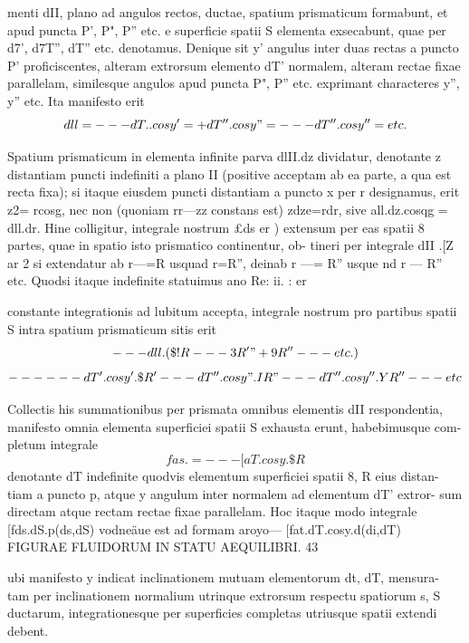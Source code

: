 \documentclass[12pt,a4paper]{article}
\begin{document}
menti   dII,    plano ad angulos rectos,       ductae,   spatium prismaticum      formabunt,
et apud puncta P', P", P'' etc. e superficie spatii S elementa exsecabunt, quae
per d7', d7T'', dT'' etc. denotamus. Denique sit y' angulus inter duas rectas
a puncto    P' proficiscentes, alteram extrorsum elemento            dT' normalem, alteram
rectae fixae parallelam, similesque angulos apud puncta              P", P'' etc. exprimant
characteres     y'', y'' etc.    Ita manifesto erit
\[            dll = ---dT..cosy' = +dT''.cosy" = ---dT''.cosy'' = etc.\]

Spatium prismaticum in elementa infinite parva dlII.dz dividatur, denotante z
distantiam puncti indefiniti a plano II (positive acceptam ab ea parte, a qua est
recta fixa); si itaque eiusdem puncti distantiam a puncto x per r designamus,
erit z2= rcosg, nec non (quoniam rr---zz constans est) zdze=rdr,                sive
all.dz.cosqg = dll.dr.    Hine colligitur, integrale nostrum £ds er              )
extensum per eas spatii 8 partes, quae in spatio isto prismatico continentur, ob-
tineri per integrale dII .[Z
ar 2 si extendatur ab r---=R usquad r=R'',
deinab r ---= R'' usque nd r --- R'' etc. Quodsi itaque indefinite statuimus
ano      Re: ii.          :
er


constante integrationis ad lubitum accepta, integrale nostrum pro partibus spatii
S intra spatium prismaticum sitis erit
\[           --- dll.(\$! R---3R'"+9R''---               etc.)\]
\[           --- ---dT'.cosy'.\$R'---dT''.cosy".IR"---dT''.cosy''.YR''---                         etc\]

Collectis his summationibus per prismata omnibus elementis dII respondentia,
manifesto omnia elementa superficiei spatii S exhausta erunt, habebimusque com-
pletum integrale
\[                          fas. =                    --- [aT.cosy.\$R\]
denotante      dT indefinite quodvis elementum superficiei spatii         8, R   eius distan-
tiam a puncto p, atque y angulum inter normalem ad elementum dT' extror-
sum directam atque rectam rectae fixae parallelam.
Hoc itaque modo integrale [fds.dS.p(ds,dS) vodneäue est ad formam
aroyo--- [fat.dT.cosy.d(di,dT)
FIGURAE FLUIDORUM IN STATU AEQUILIBRI.                             43

ubi manifesto      y indicat inclinationem mutuam elementorum                dt, dT,   mensura-
tam per inclinationem normalium utrinque extrorsum respectu spatiorum                         s, S
ductarum,     integrationesque      per superficies completas utriusque spatii extendi
debent.
\end{document}
